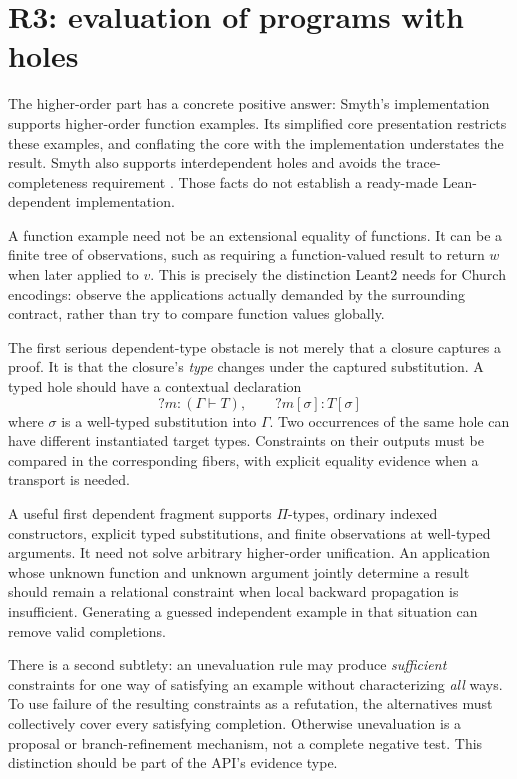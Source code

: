 \section{R3: evaluation of programs with holes}
\label{sec:evaluation}

\ans The higher-order part has a concrete positive answer: Smyth's implementation supports higher-order function examples. Its simplified core presentation restricts these examples, and conflating the core with the implementation understates the result. Smyth also supports interdependent holes and avoids the trace-completeness requirement \cite{smyth}. Those facts do not establish a ready-made Lean-dependent implementation.

A function example need not be an extensional equality of functions. It can be a finite tree of observations, such as requiring a function-valued result to return $w$ when later applied to $v$. This is precisely the distinction Leant2 needs for Church encodings: observe the applications actually demanded by the surrounding contract, rather than try to compare function values globally.

The first serious dependent-type obstacle is not merely that a closure captures a proof. It is that the closure's \emph{type} changes under the captured substitution. A typed hole should have a contextual declaration
\[
  ?m:(\Gamma\vdash T),\qquad ?m[\sigma]:T[\sigma]
\]
where $\sigma$ is a well-typed substitution into $\Gamma$. Two occurrences of the same hole can have different instantiated target types. Constraints on their outputs must be compared in the corresponding fibers, with explicit equality evidence when a transport is needed.

A useful first dependent fragment supports $\Pi$-types, ordinary indexed constructors, explicit typed substitutions, and finite observations at well-typed arguments. It need not solve arbitrary higher-order unification. An application whose unknown function and unknown argument jointly determine a result should remain a relational constraint when local backward propagation is insufficient. Generating a guessed independent example in that situation can remove valid completions.

There is a second subtlety: an unevaluation rule may produce \emph{sufficient} constraints for one way of satisfying an example without characterizing \emph{all} ways. To use failure of the resulting constraints as a refutation, the alternatives must collectively cover every satisfying completion. Otherwise unevaluation is a proposal or branch-refinement mechanism, not a complete negative test. This distinction should be part of the API's evidence type.

